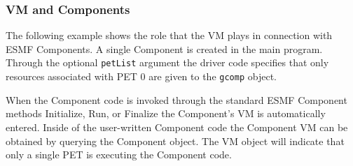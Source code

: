  
\setlength{\oldparskip}{\parskip}
\setlength{\parskip}{1.5ex}
\setlength{\oldparindent}{\parindent}
\setlength{\parindent}{0pt}
\setlength{\oldbaselineskip}{\baselineskip}
\setlength{\baselineskip}{11pt}
 
\def\bv{\begin{verbatim}}
\def\ev{\end{verbatim}}
\def\be{\begin{equation}}
\def\ee{\end{equation}}
\def\bea{\begin{eqnarray}}
\def\eea{\end{eqnarray}}
\def\bi{\begin{itemize}}
\def\ei{\end{itemize}}
\def\bn{\begin{enumerate}}
\def\en{\end{enumerate}}
\def\bd{\begin{description}}
\def\ed{\end{description}}
\def\({\left (}
\def\){\right )}
\def\[{\left [}
\def\]{\right ]}
\def\<{\left  \langle}
\def\>{\right \rangle}
\def\cI{{\cal I}}
\def\diag{\mathop{\rm diag}}
\def\tr{\mathop{\rm tr}}


 

  
   \subsubsection{VM and Components}
  
   The following example shows the role that the VM plays in connection with ESMF 
   Components. A single Component is created in the main program. Through the
   optional {\tt petList} argument the driver code specifies that only resources
   associated with PET 0 are given to the {\tt gcomp} object. 
  
   When the Component code is invoked through the standard ESMF Component methods
   Initialize, Run, or Finalize the Component's VM is automatically entered.
   Inside of the user-written Component code the Component VM can be obtained
   by querying the Component object. The VM object will indicate that only a
   single PET is executing the Component code.
   
